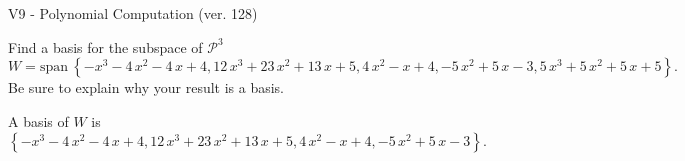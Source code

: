 \begin{exercise}
  \begin{exerciseTitle}V9 - Polynomial Computation (ver. 128)\end{exerciseTitle}
  \begin{exerciseStatement}
    Find a basis for the subspace of \(\mathcal{P}^3\) 
\[W=\mathrm{span}\ \left\{-x^{3} - 4 \, x^{2} - 4 \, x + 4 , 12 \, x^{3} + 23 \, x^{2} + 13 \, x + 5 , 4 \, x^{2} - x + 4 , -5 \, x^{2} + 5 \, x - 3 , 5 \, x^{3} + 5 \, x^{2} + 5 \, x + 5\right\}.\]
 Be sure to explain why your result is a basis.


  \end{exerciseStatement}
  \begin{exerciseAnswer}
   A basis of \(W\) is  \(\left\{-x^{3} - 4 \, x^{2} - 4 \, x + 4 , 12 \, x^{3} + 23 \, x^{2} + 13 \, x + 5 , 4 \, x^{2} - x + 4 , -5 \, x^{2} + 5 \, x - 3\right\}\).
  


  \end{exerciseAnswer}
\end{exercise}